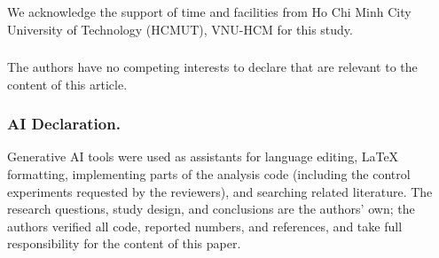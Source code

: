 \documentclass{llncs}
\begin{document}
\begin{credits}
\subsubsection{\ackname} We acknowledge the support of time and facilities
from Ho Chi Minh City University of Technology (HCMUT), VNU-HCM for this
study.

\subsubsection{\discintname} The authors have no competing interests to declare that are relevant to the content of this article.

\subsubsection{AI Declaration.}
Generative AI tools were used as assistants for language
editing, LaTeX formatting, implementing parts of the analysis code
(including the control experiments requested by the reviewers), and searching
related literature. The research questions, study design, and conclusions are
the authors' own; the authors verified all code, reported numbers, and
references, and take full responsibility for the content of this paper.
\end{credits}




\end{document}
